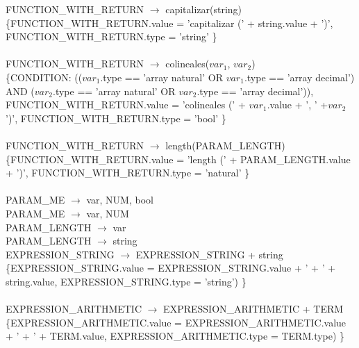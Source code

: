 \documentclass[10pt,a4paper]{article}
\begin{document}
{{{FUNCTION\_WITH\_RETURN $\rightarrow$ capitalizar(string)   \\

\{FUNCTION\_WITH\_RETURN.value =  'capitalizar (' + string.value + ')', FUNCTION\_WITH\_RETURN.type = 'string'  \}  \\ \\


FUNCTION\_WITH\_RETURN $\rightarrow$ colineales($var_{1}$, $var_{2}$)   \\

\{CONDITION: (($var_{1}$.type == 'array natural' OR $ var_{1}$.type == 'array decimal') AND
($var_{2}$.type == 'array natural' OR $var_{2}$.type == 'array decimal')), FUNCTION\_WITH\_RETURN.value =  'colineales (' + $var_{1}$.value + ', ' +$var_{2}$')', FUNCTION\_WITH\_RETURN.type = 'bool'  \}  \\ \\


FUNCTION\_WITH\_RETURN $\rightarrow$ length(PARAM\_LENGTH) \\

\{FUNCTION\_WITH\_RETURN.value =  'length (' + PARAM\_LENGTH.value + ')', FUNCTION\_WITH\_RETURN.type = 'natural'  \}  \\ \\



PARAM\_ME $\rightarrow$ var, NUM, bool   \\

PARAM\_ME $\rightarrow$ var, NUM \\

PARAM\_LENGTH $\rightarrow$ var    \\

PARAM\_LENGTH $\rightarrow$ string \\


EXPRESSION\_STRING $\rightarrow$ EXPRESSION\_STRING + string \\  

\{EXPRESSION\_STRING.value =  EXPRESSION\_STRING.value + ' + ' + string.value, EXPRESSION\_STRING.type = 'string') \}  \\ \\


EXPRESSION\_ARITHMETIC $\rightarrow$ EXPRESSION\_ARITHMETIC + TERM   \\

\{EXPRESSION\_ARITHMETIC.value =  EXPRESSION\_ARITHMETIC.value + ' + ' + TERM.value, EXPRESSION\_ARITHMETIC.type = TERM.type) \}  \\ \\


}}}
\end{document}

